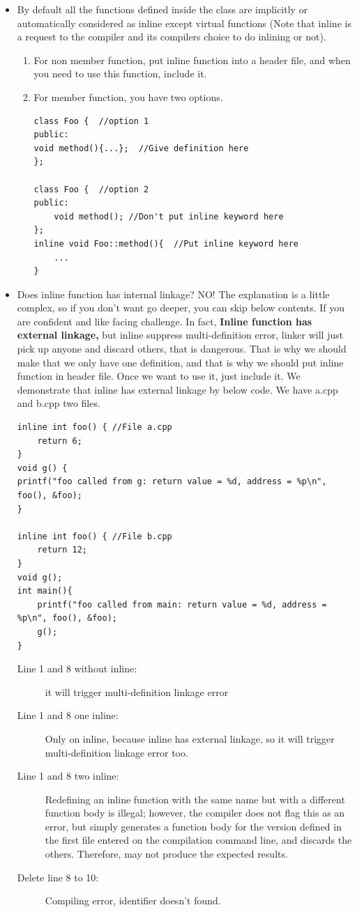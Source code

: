 \documentclass[a4paper,11pt,twoside]{book}
\begin{document}
\begin{itemize}
	\item By default all the functions defined inside the class are implicitly or automatically considered as inline except virtual functions (Note that inline is a request to the compiler and its compilers choice to do inlining or not).
	
	\begin{enumerate}
		\item For non member function, put inline function into a header file, and when you need to use this function, include it.
		
		\item For member function, you have two options.
\begin{lstlisting}[numbers=none]
class Foo {  //option 1
public:
void method(){...};  //Give definition here
};

class Foo {  //option 2
public:
	void method(); //Don't put inline keyword here
};
inline void Foo::method(){  //Put inline keyword here
	...
}
\end{lstlisting}
	\end{enumerate}
	
	\item Does inline function has internal linkage? NO! The explanation is a little complex, so if you don't want go deeper, you can skip below contents. If you are confident and like facing challenge. In fact, \textbf{Inline function has external linkage,} but inline suppress multi-definition error, linker will just pick up anyone and discard others, that is dangerous. That is why we should make that we only have one definition, and that is why we should put inline function in header file. Once we want to use it, just include it. We demonstrate that inline has external linkage by below code. We have a.cpp and b.cpp two files.
\begin{lstlisting}
inline int foo() { //File a.cpp
	return 6;
}
void g() {
printf("foo called from g: return value = %d, address = %p\n", foo(), &foo);
}

inline int foo() { //File b.cpp
	return 12;
}
void g();
int main(){
	printf("foo called from main: return value = %d, address = %p\n", foo(), &foo);
	g();
}
\end{lstlisting} 
\begin{description}
	\item[Line 1 and 8 without inline:] it will trigger multi-definition linkage error
	\item[Line 1 and 8 one inline:] Only on inline, because inline has external linkage, so it will trigger multi-definition linkage error too.
	\item[Line 1 and 8 two inline:] Redefining an inline function with the same name but with a different function body is illegal; however, the compiler does not flag this as an error, but simply generates a function body for the version defined in the first file entered on the compilation command line, and discards the others. Therefore, may not produce the expected results.
	\item[Delete line 8 to 10:] Compiling error, identifier doesn't found.	
\end{description}

		
\end{itemize}
\end{document}
